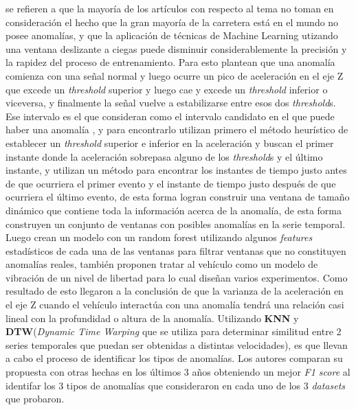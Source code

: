\cite{zheng2020fused} se refieren a que la mayoría de los artículos con respecto al tema no toman en consideración el hecho que la gran mayoría de la
carretera está en el mundo no posee anomalías, y que la aplicación de técnicas de Machine Learning utizando una ventana deslizante a ciegas puede
disminuir considerablemente la precisión y la rapidez del proceso de entrenamiento. Para esto plantean que una anomalía comienza con una señal normal
y luego ocurre un pico de aceleración en el eje Z que excede un \emph{threshold} superior y luego cae y excede un \emph{threshold} inferior o viceversa,
y finalmente la señal vuelve a estabilizarse entre esos dos \emph{threshold}s. Ese intervalo es el que consideran como el intervalo candidato en el que
puede haber una anomalía , y para encontrarlo utilizan primero el método heurístico de establecer un \emph{threshold} superior e inferior en la aceleración
y buscan el primer instante donde la aceleración sobrepasa alguno de los \emph{threshold}s y el último instante, y utilizan un método para encontrar los
instantes de tiempo justo antes de que ocurriera el primer evento y el instante de tiempo justo después de que ocurriera el último evento, de esta forma
logran construir una ventana de tamaño dinámico que contiene toda la información acerca de la anomalía, de esta forma construyen un conjunto de ventanas
con posibles anomalías en la serie temporal. Luego crean un modelo con un random forest utilizando algunos \emph{features} estadísticos de cada una de las ventanas
para filtrar ventanas que no constituyen anomalías reales, también proponen tratar al vehículo como un modelo de vibración de un nivel de libertad para lo
cual diseñan varios experimentos. Como resultado de esto llegaron a la conclusión de que la varianza de la aceleración en el eje Z cuando el vehículo interactúa
con una anomalía tendrá una relación casi lineal con la profundidad o altura de la anomalía. Utilizando \textbf{KNN} y \textbf{DTW}(\emph{Dynamic Time Warping}
que se utiliza para determinar similitud entre 2 series temporales que puedan ser obtenidas a distintas velocidades), es que llevan a cabo el proceso
de identificar los tipos de anomalías. Los autores comparan su propuesta con otras hechas en los últimos 3 años obteniendo un mejor \emph{F1 score} al
identifar los 3 tipos de anomalías que consideraron en cada uno de los 3 \emph{datasets} que probaron.
